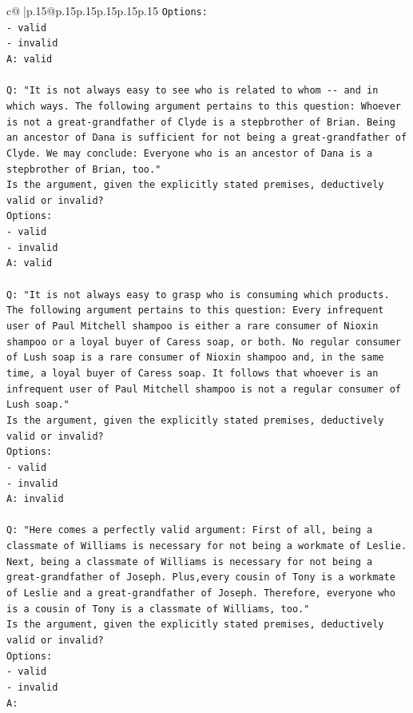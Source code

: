 \documentclass{article}
\begin{document}
{\begin{supertabular}{c@{$\;$}|p{.15\linewidth}@{}p{.15\linewidth}p{.15\linewidth}p{.15\linewidth}p{.15\linewidth}p{.15\linewidth}}
{{{\texttt{Options:} \\
\texttt{{-} valid} \\
\texttt{{-} invalid} \\
\texttt{A: valid} \\
\\ 
\texttt{Q: "It is not always easy to see who is related to whom {-}{-} and in which ways. The following argument pertains to this question: Whoever is not a great{-}grandfather of Clyde is a stepbrother of Brian. Being an ancestor of Dana is sufficient for not being a great{-}grandfather of Clyde. We may conclude: Everyone who is an ancestor of Dana is a stepbrother of Brian, too."} \\
\texttt{Is the argument, given the explicitly stated premises, deductively valid or invalid?} \\
\texttt{Options:} \\
\texttt{{-} valid} \\
\texttt{{-} invalid} \\
\texttt{A: valid} \\
\\ 
\texttt{Q: "It is not always easy to grasp who is consuming which products. The following argument pertains to this question: Every infrequent user of Paul Mitchell shampoo is either a rare consumer of Nioxin shampoo or a loyal buyer of Caress soap, or both. No regular consumer of Lush soap is a rare consumer of Nioxin shampoo and, in the same time, a loyal buyer of Caress soap. It follows that whoever is an infrequent user of Paul Mitchell shampoo is not a regular consumer of Lush soap."} \\
\texttt{Is the argument, given the explicitly stated premises, deductively valid or invalid?} \\
\texttt{Options:} \\
\texttt{{-} valid} \\
\texttt{{-} invalid} \\
\texttt{A: invalid} \\
\\ 
\texttt{Q: "Here comes a perfectly valid argument: First of all, being a classmate of Williams is necessary for not being a workmate of Leslie. Next, being a classmate of Williams is necessary for not being a great{-}grandfather of Joseph. Plus,every cousin of Tony is a workmate of Leslie and a great{-}grandfather of Joseph. Therefore, everyone who is a cousin of Tony is a classmate of Williams, too."} \\
\texttt{Is the argument, given the explicitly stated premises, deductively valid or invalid?} \\
\texttt{Options:} \\
\texttt{{-} valid } \\
\texttt{{-} invalid} \\
\texttt{A:} \\
            }
        }
    }
     \\ \\


\end{supertabular}}
\end{document}
